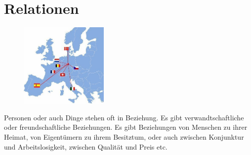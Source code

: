 \documentclass[%
11pt,%
twoside,%
titlepage,%
german,%
headsepline%
]{scrartcl}
\begin{document}
\cleardoublepage

\appendix

\section{Relationen}
\begin{figure}
  \begin{center}
    \includegraphics[width=0.382\textwidth]{pictures/relationen}
  \end{center}
\end{figure}
Personen oder auch Dinge stehen oft in Beziehung. Es gibt verwandtschaftliche oder freundschaftliche Beziehungen. Es gibt Beziehungen von Menschen zu ihrer Heimat, von Eigent\"umern zu ihrem Besitztum, oder auch zwischen Konjunktur und Arbeitslosigkeit, zwischen Qualit\"at und Preis etc.
\end{document}
